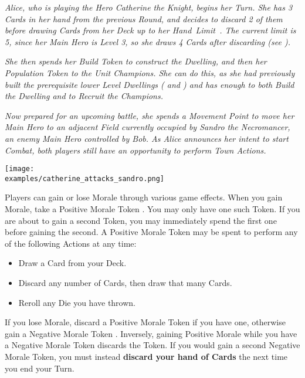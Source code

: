 \begin{multicols*}{2}
\vspace*{\fill}
\vspace*{\fill}

\columnbreak
{}

\textit{Alice, who is playing the Hero Catherine the Knight, begins her Turn.
She has 3 Cards in her hand from the previous Round, and decides to discard 2 of them before drawing Cards from her Deck up to her \mbox{Hand Limit .}
The current limit is 5, since her Main Hero is Level 3, so she draws 4 Cards after discarding (see ).}\par
\textit{She then spends her Build Token to construct the  Dwelling, and then her Population Token to  the  Unit Champions.
She can do this, as she had previously built the prerequisite lower Level Dwellings ( and ) and has enough  to both Build the Dwelling and to Recruit the Champions.}\par
\textit{Now prepared for an upcoming battle, she spends a Movement Point to move her Main Hero to an adjacent Field currently occupied by Sandro the Necromancer, an enemy Main Hero controlled by Bob.
As Alice announces her intent to start Combat, both players still have an opportunity to perform Town Actions.}\par

\texttt{[image: \\examples/catherine\_attacks\_sandro.png]}
\vspace*{\fill}
\columnbreak

Players can gain or lose Morale through various game effects.
When you gain Morale, take a Positive Morale Token .
You may only have one such Token.
If you are about to gain a second Token, you may immediately spend the first one before gaining the second.
A Positive Morale Token may be spent to perform any of the following Actions at any time:
\begin{itemize}
  \item Draw a Card from your Deck.
  \item Discard any number of Cards, then draw that many Cards.
  \item Reroll any Die you have thrown.
\end{itemize}
If you lose Morale, discard a Positive Morale Token  if you have one, otherwise gain a Negative Morale Token .
Inversely, gaining Positive Morale while you have a Negative Morale Token discards the Token.
If you would gain a second Negative Morale Token, you must instead \textbf{discard your hand of Cards} the next time you end your Turn.\par


\end{multicols*}
